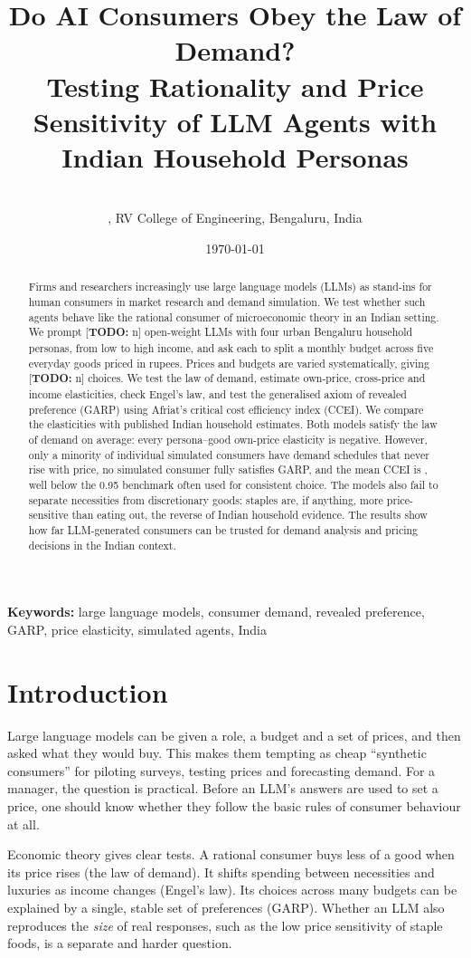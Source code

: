 \documentclass[11pt,a4paper]{article}
\title{Do AI Consumers Obey the Law of Demand?\\ \large Testing Rationality and Price Sensitivity of LLM Agents with Indian Household Personas}
\author{\todo{Names of all team members}\\ \todo{Department}, RV College of Engineering, Bengaluru, India}
\date{\today}
\newcommand{\todo}[1]{\textcolor{red!70!black}{[\textbf{TODO:} #1]}}
\newcommand{\NCalls}{\todo{n}}\newcommand{\NFailed}{\todo{n}}\newcommand{\NModels}{\todo{n}}\newcommand{\NConsumers}{\todo{n}}
\begin{document}
\maketitle

\begin{abstract}
Firms and researchers increasingly use large language models (LLMs) as stand-ins for human consumers in market research and demand simulation. We test whether such agents behave like the rational consumer of microeconomic theory in an Indian setting. We prompt \NModels{} open-weight LLMs with four urban Bengaluru household personas, from low to high income, and ask each to split a monthly budget across five everyday goods priced in rupees. Prices and budgets are varied systematically, giving \NCalls{} choices. We test the law of demand, estimate own-price, cross-price and income elasticities, check Engel's law, and test the generalised axiom of revealed preference (GARP) using Afriat's critical cost efficiency index (CCEI). We compare the elasticities with published Indian household estimates. Both models satisfy the law of demand on average: every persona--good own-price elasticity is negative. However, only a minority of individual simulated consumers have demand schedules that never rise with price, no simulated consumer fully satisfies GARP, and the mean CCEI is \MeanCCEI{}, well below the 0.95 benchmark often used for consistent choice. The models also fail to separate necessities from discretionary goods: staples are, if anything, more price-sensitive than eating out, the reverse of Indian household evidence. The results show how far LLM-generated consumers can be trusted for demand analysis and pricing decisions in the Indian context.
\end{abstract}
\noindent\textbf{Keywords:} large language models, consumer demand, revealed preference, GARP, price elasticity, simulated agents, India

\section{Introduction}
Large language models can be given a role, a budget and a set of prices, and then asked what they would buy. This makes them tempting as cheap ``synthetic consumers'' for piloting surveys, testing prices and forecasting demand. For a manager, the question is practical. Before an LLM's answers are used to set a price, one should know whether they follow the basic rules of consumer behaviour at all.

Economic theory gives clear tests. A rational consumer buys less of a good when its price rises (the law of demand). It shifts spending between necessities and luxuries as income changes (Engel's law). Its choices across many budgets can be explained by a single, stable set of preferences (GARP). Whether an LLM also reproduces the \emph{size} of real responses, such as the low price sensitivity of staple foods, is a separate and harder question.
\end{document}
